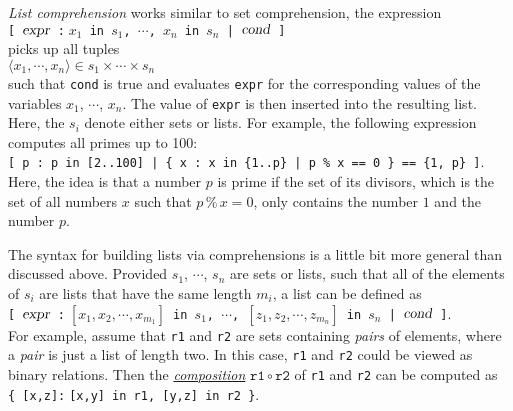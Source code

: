 \emph{List comprehension} works similar to set comprehension, the expression
\\[0.2cm]
\hspace*{1.3cm}
\texttt{[ $\textsl{expr}$ :$\;x_1$ in $s_1$, $\cdots$, $x_n$ in $s_n$ | $\textsl{cond}$ ]}
\\[0.2cm]
 picks up all tuples 
\\[0.2cm]
\hspace*{1.3cm}
$\langle x_1, \cdots, x_n \rangle \in s_1 \times \cdots \times s_n$
\\[0.2cm]
such that \texttt{cond} is true and evaluates \texttt{expr} for the corresponding values of the
variables $x_1$, $\cdots$, $x_n$.  The value of \texttt{expr} is
then inserted into the resulting list.  Here, the $s_i$ denote either sets or lists.
For example, the following expression  computes all primes up
to 100: 
\\[0.2cm]
\hspace*{1.3cm}
\texttt{[ p : p in [2..100] | \{ x : x in \{1..p\} | p \% x == 0 \} == \{1, p\} ]}.
\\[0.2cm]
Here, the idea is that a number $p$ is prime if the set of its divisors, which is the set
of all numbers $x$ such that $p \,\texttt{\%}\, x = 0$, only contains the number $1$ and
the number $p$. 

The syntax for building lists via comprehensions is a little bit more
general than discussed above.  Provided $s_1$, $\cdots$, $s_n$ are sets or lists,
such that all of the elements of $s_i$ are lists that have the same length $m_i$, a list 
can be defined as
\\[0.2cm]
\hspace*{1.3cm}
\texttt{[ $\textsl{expr}$ :$\;[x_1,x_2,\cdots,x_{m_1}]$ in $s_1$, $\cdots$, $[z_1,z_2,\cdots, z_{m_n}]$ in $s_n$ | $\textsl{cond}$ ]}.
\\[0.2cm]
For example, assume that \texttt{r1} and \texttt{r2} are sets containing \emph{pairs} of elements, where a
\emph{pair} is just a list of length two.  In this case, \texttt{r1} and \texttt{r2} could be viewed as binary
relations.  Then the 
\href{http://en.wikipedia.org/wiki/Binary_relation}{\emph{composition}} $\mathtt{r1} \circ \mathtt{r2}$ of \texttt{r1} and
\texttt{r2} can be computed as
\\[0.2cm]
\hspace*{1.3cm}
\texttt{\{ [x,z]:$\;$[x,y] in r1, [y,z] in r2 \}}.


